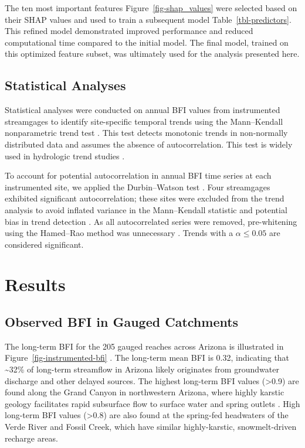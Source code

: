 \documentclass[
  authoryear,
  preprint,
  1p,
  onecolumn]{elsarticle}
\begin{document}
The ten most important features Figure~\ref{fig-shap_values} were
selected based on their SHAP values and used to train a subsequent model
Table~\ref{tbl-predictors}. This refined model demonstrated improved
performance and reduced computational time compared to the initial
model. The final model, trained on this optimized feature subset, was
ultimately used for the analysis presented here.

\subsection{Statistical Analyses}\label{statistical-analyses}

Statistical analyses were conducted on annual BFI values from
instrumented streamgages to identify site-specific temporal trends using
the Mann--Kendall nonparametric trend test
\citep{kendall1970, mann1945nonparametric}. This test detects monotonic
trends in non-normally distributed data and assumes the absence of
autocorrelation. This test is widely used in hydrologic trend studies
\citep{ficklin2016, ayers2019, woodhouse_udall22}.

To account for potential autocorrelation in annual BFI time series at
each instrumented site, we applied the Durbin--Watson test
\citep{durbin1950testing}. Four streamgages exhibited significant
autocorrelation; these sites were excluded from the trend analysis to
avoid inflated variance in the Mann--Kendall statistic and potential
bias in trend detection \citep{MK_Hamed1998}. As all autocorrelated
series were removed, pre-whitening using the Hamed--Rao method was
unnecessary \citep{MK_Hamed1998}. Trends with a \(\alpha \le 0.05\) are
considered significant.

\section{Results}\label{results}

\subsection{Observed BFI in Gauged
Catchments}\label{observed-bfi-in-gauged-catchments}

The long-term BFI for the 205 gauged reaches across Arizona is
illustrated in Figure~\ref{fig-instrumented-bfi} . The long-term mean
BFI is 0.32, indicating that \textasciitilde32\% of long-term streamflow
in Arizona likely originates from groundwater discharge and other
delayed sources. The highest long-term BFI values (\textgreater0.9) are
found along the Grand Canyon in northwestern Arizona, where highly
karstic geology facilitates rapid subsurface flow to surface water and
spring outlets \citep{chambless_deep-karst_2023}. High long-term BFI
values (\textgreater0.8) are also found at the spring-fed headwaters of
the Verde River and Fossil Creek, which have similar highly-karstic,
snowmelt-driven recharge areas.
\end{document}
